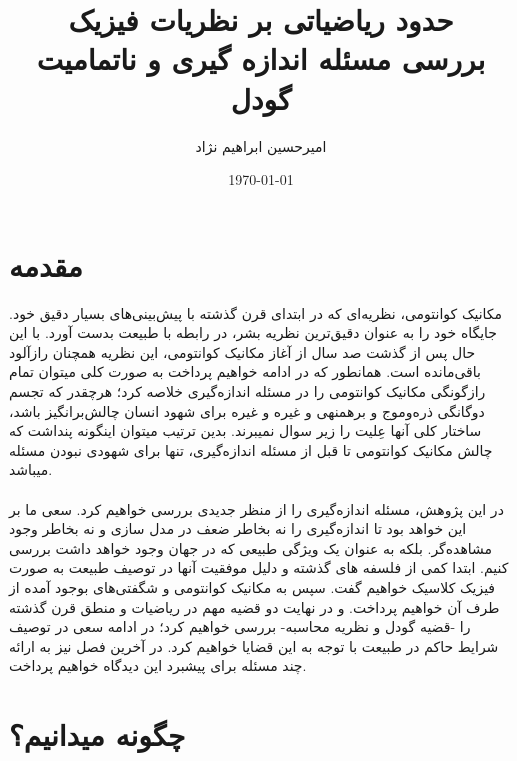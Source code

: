 \documentclass[9pt, twocolumn]{article}
\title{حدود ریاضیاتی بر نظریات فیزیک
\\ \large بررسی مسئله اندازه گیری و ناتمامیت گودل}
\author{امیرحسین ابراهیم نژاد}
\date{\today}
\begin{document}
    \maketitle
    \tableofcontents
    \newpage
    \section{مقدمه}
        مکانیک کوانتومی، نظریه‌ای که در ابتدای قرن گذشته با پیش‌بینی‌های بسیار دقیق خود. جایگاه خود را به عنوان دقیق‌ترین نظریه بشر، در رابطه با طبیعت بدست آورد. با این حال پس از گذشت صد سال از آغاز مکانیک کوانتومی، این نظریه همچنان رازآلود باقی‌مانده است. همانطور که در ادامه خواهیم پرداخت به صورت کلی میتوان تمام رازگونگی مکانیک کوانتومی را در مسئله اندازه‌گیری خلاصه کرد؛ هرچقدر که تجسم دوگانگی ذره‌و‌موج و برهمنهی و غیره و غیره برای شهود انسان چالش‌برانگیز باشد، ساختار کلی آنها عِلیت را زیر سوال نمیبرند. بدین ترتیب میتوان اینگونه پنداشت که چالش مکانیک کوانتومی تا قبل از مسئله اندازه‌گیری، تنها برای شهودی نبودن مسئله میباشد.
        \\
        \\
        در این پژوهش، مسئله اندازه‌گیری را از منظر جدیدی بررسی خواهیم کرد. سعی ما بر این خواهد بود تا اندازه‌گیری را نه بخاطر ضعف در مدل سازی و نه بخاطر وجود مشاهده‌گر. بلکه به عنوان یک ویژگی طبیعی که در جهان وجود خواهد داشت بررسی کنیم. ابتدا کمی از فلسفه های گذشته و دلیل موفقیت آنها در توصیف طبیعت به صورت فیزیک کلاسیک  خواهیم گفت. سپس به مکانیک کوانتومی و شگفتی‌های بوجود آمده از طرف آن خواهیم پرداخت. و در نهایت دو قضیه مهم در ریاضیات و منطق قرن گذشته را -قضیه گودل و نظریه محاسبه- بررسی خواهیم کرد؛ در ادامه سعی در توصیف شرایط حاکم در طبیعت با توجه به این قضایا خواهیم کرد. در آخرین فصل نیز به ارائه چند مسئله برای پیشبرد این دیدگاه خواهیم پرداخت.
    \section{چگونه میدانیم؟}
\end{document}
